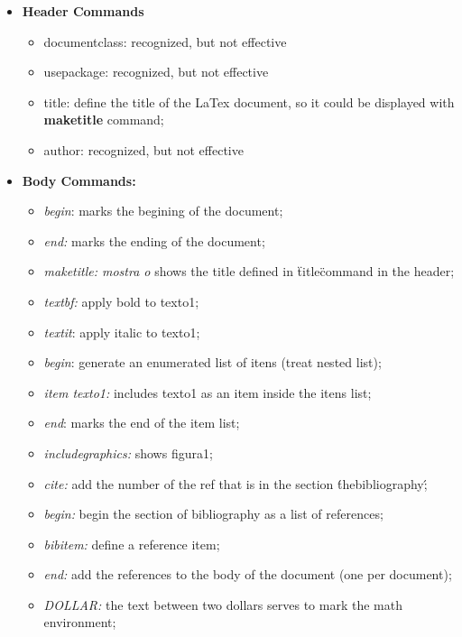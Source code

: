 \documentclass{article}
\begin{document}
\begin{itemize}

	\item \textbf{Header Commands}
		\begin{itemize}
			 \item documentclass: recognized, but not effective
			 \item usepackage:  recognized, but not effective
			 \item title: define the title of the LaTex document, so it could be displayed with \textbf{maketitle} command;
			 \item author: recognized, but not effective
		\end{itemize}

	\item \textbf{Body Commands:}
		\begin{itemize}
	 		\item \textit{begin}: marks the begining of the document;
	 		\item \textit{end:} marks the ending of the document;
	 		\item \textit{maketitle: mostra o} shows the title defined in \"title\" command in the header;
	 		\item \textit{textbf:} apply bold to texto1;
	 		\item \textit{textit}: apply italic to texto1;
	 		\item \textit{begin}: generate an enumerated list of itens (treat nested list);
	 		\item \textit{item texto1:} includes texto1 as an item inside the itens list; 
	 		\item \textit{end}: marks the end of the item list;
	 		\item \textit{includegraphics:} shows figura1;
	 		\item \textit{cite:} add the number of the ref that is in the section \'thebibliography\';
	 		\item \textit{begin:} begin the section of bibliography as a list of references;
	 		\item \textit{bibitem:} define a reference item;
	 		\item \textit{end:} add the references to the body of the document (one per document);
	 		\item \textit{DOLLAR:} the text between two dollars serves to mark the math environment;
		\end{itemize}

\end{itemize}
\end{document}
